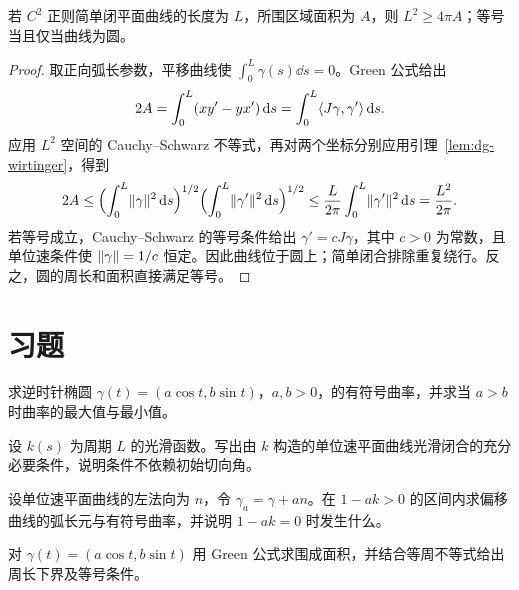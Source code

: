 \begin{theorem}[平面等周不等式]
若 $C^2$ 正则简单闭平面曲线的长度为 $L$，所围区域面积为 $A$，则 $L^2\ge4\pi A$；等号当且仅当曲线为圆。
\end{theorem}
\begin{proof}
取正向弧长参数，平移曲线使 $\int_0^L\gamma(s)\dd s=0$。Green 公式给出
\[
 2A=\int_0^L(xy'-yx')\mathop{}\!\mathrm d s
 =\int_0^L\langle J\gamma,\gamma'\rangle\mathop{}\!\mathrm d s.
\]
应用 $L^2$ 空间的 Cauchy--Schwarz 不等式，再对两个坐标分别应用引理~\ref{lem:dg-wirtinger}，得到
\[
 2A\le\Bigl(\int_0^L\lVert \gamma\rVert^2\mathop{}\!\mathrm d s\Bigr)^{1/2}
          \Bigl(\int_0^L\lVert \gamma'\rVert^2\mathop{}\!\mathrm d s\Bigr)^{1/2}
 \le\frac L{2\pi}\int_0^L\lVert \gamma'\rVert^2\mathop{}\!\mathrm d s
 =\frac{L^2}{2\pi}.
\]
若等号成立，Cauchy--Schwarz 的等号条件给出 $\gamma'=cJ\gamma$，其中 $c>0$ 为常数，且单位速条件使 $\lVert \gamma\rVert=1/c$ 恒定。因此曲线位于圆上；简单闭合排除重复绕行。反之，圆的周长和面积直接满足等号。
\end{proof}

\section{习题}
\begin{exercise}\label{ex:dg-plane-ellipse}
求逆时针椭圆 $\gamma(t)=(a\cos t,b\sin t)$，$a,b>0$，的有符号曲率，并求当 $a>b$ 时曲率的最大值与最小值。
\end{exercise}
\begin{exercise}\label{ex:dg-plane-closed}
设 $k(s)$ 为周期 $L$ 的光滑函数。写出由 $k$ 构造的单位速平面曲线光滑闭合的充分必要条件，说明条件不依赖初始切向角。
\end{exercise}
\begin{exercise}\label{ex:dg-plane-offset}
设单位速平面曲线的左法向为 $n$，令 $\gamma_a=\gamma+an$。在 $1-ak>0$ 的区间内求偏移曲线的弧长元与有符号曲率，并说明 $1-ak=0$ 时发生什么。
\end{exercise}
\begin{exercise}\label{ex:dg-plane-area}
对 $\gamma(t)=(a\cos t,b\sin t)$ 用 Green 公式求围成面积，并结合等周不等式给出周长下界及等号条件。
\end{exercise}

